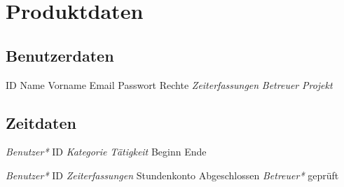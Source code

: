 \section{Produktdaten}

\subsection{Benutzerdaten}
\begin{requirements}
	\begin{requirements}
		 ID
		 Name
		 Vorname
		 Email
		 Passwort
		 Rechte
		 \emph{Zeiterfassungen}
		 \emph{Betreuer}
		 \emph{Projekt}
	\end{requirements}
\end{requirements}

\subsection{Zeitdaten}
\begin{requirements}
	\req [Zeiterfassung] {D20}
	\begin{requirements}
		 \emph{Benutzer*} ID
		 \emph{Kategorie}
		 \emph{Tätigkeit}
		 Beginn
		 Ende
	\end{requirements}

	\req [Stundenzettel] {D30}
	\begin{requirements}
		 \emph{Benutzer*} ID
		 \emph{Zeiterfassungen}
		 Stundenkonto
		 Abgeschlossen
		 \emph{Betreuer*} geprüft
	\end{requirements}
\end{requirements}


